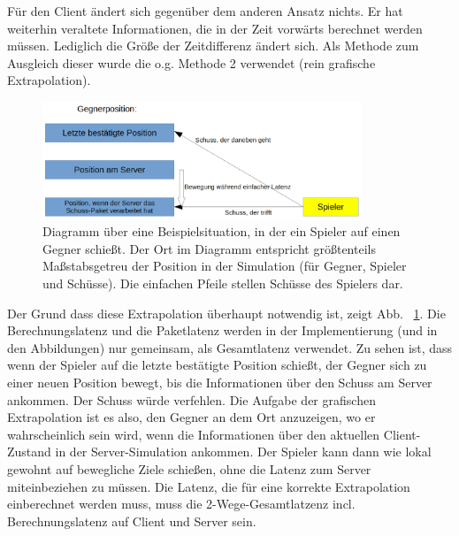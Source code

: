 Für den Client ändert sich gegenüber dem anderen Ansatz nichts. Er hat weiterhin veraltete Informationen, die in der Zeit vorwärts berechnet werden müssen. Lediglich die Größe der Zeitdifferenz ändert sich. Als Methode zum Ausgleich dieser wurde die o.g. Methode 2 verwendet (rein grafische Extrapolation).
\begin{figure}
    \centering
    \includegraphics[width=0.85\textwidth]{./Gegnerposition1a.png}
    \caption{Diagramm über eine Beispielsituation, in der ein Spieler auf einen Gegner schießt. Der Ort im Diagramm entspricht größtenteils Maßstabsgetreu der Position in der Simulation (für Gegner, Spieler und Schüsse). Die einfachen Pfeile stellen Schüsse des Spielers dar.}
    \label{fig:gegnerposition1a}
\end{figure}
Der Grund dass diese Extrapolation überhaupt notwendig ist, zeigt Abb. ~\ref{fig:gegnerposition1a}. Die Berechnungslatenz und die Paketlatenz werden in der Implementierung (und in den Abbildungen) nur gemeinsam, als Gesamtlatenz verwendet. Zu sehen ist, dass wenn der Spieler auf die letzte bestätigte Position schießt, der Gegner sich zu einer neuen Position bewegt, bis die Informationen über den Schuss am Server ankommen. Der Schuss würde verfehlen. Die Aufgabe der grafischen Extrapolation ist es also, den Gegner an dem Ort anzuzeigen, wo er wahrscheinlich sein wird, wenn die Informationen über den aktuellen Client-Zustand in der Server-Simulation ankommen. Der Spieler kann dann wie lokal gewohnt auf bewegliche Ziele schießen, ohne die Latenz zum Server miteinbeziehen zu müssen.
Die Latenz, die für eine korrekte Extrapolation einberechnet werden muss, muss die 2-Wege-Gesamtlatzenz incl. Berechnungslatenz auf Client und Server sein.


